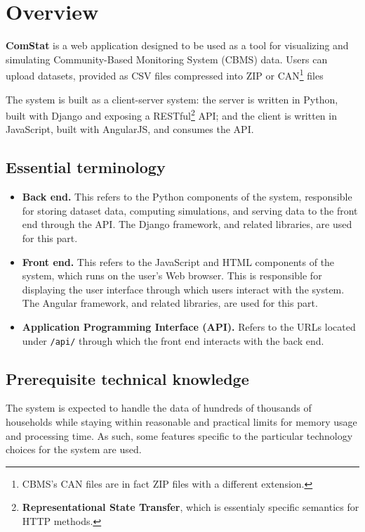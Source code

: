 
\section{Overview}

\textbf{ComStat} is a web application designed to be used as a tool for visualizing and simulating Community-Based Monitoring System (CBMS) data. Users can upload datasets, provided as CSV files compressed into ZIP or
CAN\footnote{CBMS's CAN files are in fact ZIP files with a different extension.}
files

The system is built as a client-server system: the server is written in Python, built with Django and exposing a
RESTful\footnote{\textbf{Representational State Transfer}, which is essentialy specific semantics for HTTP methods.}
API; and the client is written in JavaScript, built with AngularJS, and consumes the API.


\subsection{Essential terminology}

\begin{itemize}
    \item \textbf{Back end.} This refers to the Python components of the system, responsible for storing dataset data, computing simulations, and serving data to the front end through the API. The Django framework, and related libraries, are used for this part.
    \item \textbf{Front end.} This refers to the JavaScript and HTML components of the system, which runs on the user's Web browser. This is responsible for displaying the user interface through which users interact with the system. The Angular framework, and related libraries, are used for this part.
    \item \textbf{Application Programming Interface (API).} Refers to the URLs located under \texttt{/api/} through which the front end interacts with the back end.
\end{itemize}


\subsection{Prerequisite technical knowledge}

The system is expected to handle the data of hundreds of thousands of households while staying within reasonable and practical limits for memory usage and processing time. As such, some features specific to the particular technology choices for the system are used.


